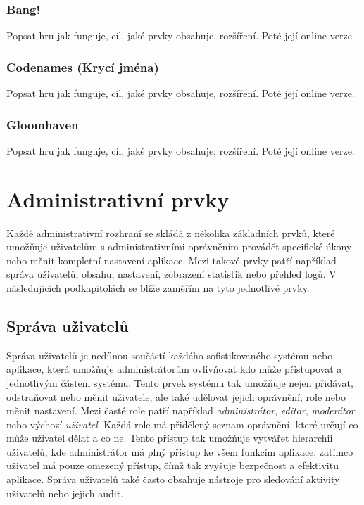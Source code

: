 \subsubsection{Bang!}
\label{subsubsec:popular-board-games-analysis-bang}
Popsat hru jak funguje, cíl, jaké prvky obsahuje, rozšíření. Poté její online verze.

\subsubsection{Codenames (Krycí jména)}
\label{subsubsec:popular-board-games-analysis-codenames}
Popsat hru jak funguje, cíl, jaké prvky obsahuje, rozšíření. Poté její online verze.

\subsubsection{Gloomhaven}
\label{subsubsec:popular-board-games-analysis-gloomhaven}
Popsat hru jak funguje, cíl, jaké prvky obsahuje, rozšíření. Poté její online verze.

\section{Administrativní prvky}
\label{sec:admin-elements}
Každé administrativní rozhraní se skládá z několika základních prvků, které umožňuje uživatelům s administrativními oprávněním provádět specifické úkony nebo měnit kompletní nastavení aplikace. Mezi takové prvky patří například správa uživatelů, obsahu, nastavení, zobrazení statistik nebo přehled logů. V následujících podkapitolách se blíže zaměřím na tyto jednotlivé prvky.

\subsection{Správa uživatelů}
\label{subsec:admin-elements-user-management}
Správa uživatelů je nedílnou součástí každého sofistikovaného systému nebo aplikace, která umožňuje administrátorům ovlivňovat kdo může přistupovat a jednotlivým částem systému. Tento prvek systému tak umožňuje nejen přidávat, odstraňovat nebo měnit uživatele, ale také udělovat jejich oprávnění, role nebo měnit nastavení. Mezi časté role patří například \textit{administrátor}, \textit{editor}, \textit{moderátor} nebo výchozí \textit{uživatel}. Každá role má přidělený seznam oprávnění, které určují co může uživatel dělat a co ne. Tento přístup tak umožňuje vytvářet hierarchii uživatelů, kde administrátor má plný přístup ke všem funkcím aplikace, zatímco uživatel má pouze omezený přístup, čímž tak zvyšuje bezpečnost a efektivitu aplikace. Správa uživatelů také často obsahuje nástroje pro sledování aktivity uživatelů nebo jejich audit.

